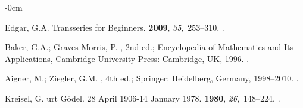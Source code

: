 \documentclass[axioms,article,accept,oneauthor,pdftex]{Definitions/mdpi}
\begin{document}
\begin{adjustwidth}{-\extralength}{0cm}
\begin{thebibliography}{999}
Edgar, G.A.
\newblock Transseries for Beginners.
 {\bf 2009}, {\em 35},~253--310,
.

Baker, G.A.; Graves-Morris, P.
, 2nd ed.; Encyclopedia of Mathematics and Its
  Applications, Cambridge University Press: Cambridge, UK,  1996.
.

Aigner, M.; Ziegler, G.M.
, 4th ed.; Springer: Heidelberg, Germany,
  1998--2010.
.

Kreisel, G.
urt {G}\"odel. 28 {A}pril 1906-14 {J}anuary 1978.
 {\bf
  1980}, {\em 26},~148--224.
.

\end{thebibliography}
\PublishersNote{}
\end{adjustwidth}






\end{document}
